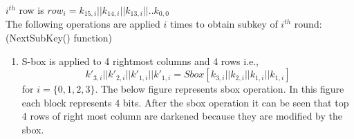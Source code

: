\documentclass[final]{transcrypto}
\begin{document}
$i^{th}$ row is $row_{i} = k_{15,i}||k_{14,i}||k_{13,i}||..k_{0,0}$\\
\newline
The following operations are applied $i$ times to obtain subkey of $i^{th}$ round:\\
(NextSubKey() function)\\
\begin{enumerate}
    \item S-box is applied to 4 rightmost columns and 4 rows i.e.,
$$k'_{3,i}||k'_{2,i}||k'_{1,i}||k'_{1,i} = Sbox[k_{3,i}||k_{2,i}||k_{1,i}||k_{1,i}]$$ for $i=\{0,1,2,3\}$.
The below figure represents sbox operation. In this figure each block represents 4 bits. After the sbox operation it can be seen that top 4 rows of right most column are darkened because they are modified by the sbox.


\end{enumerate}
\end{document}
